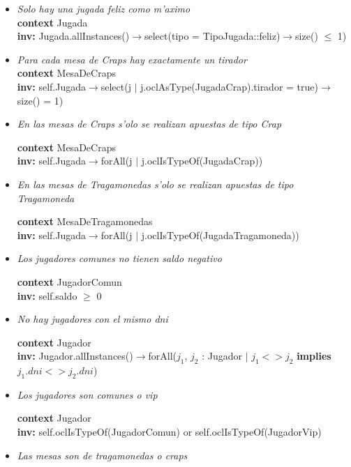 \begin{itemize}
 \item \textit{ Solo hay una jugada feliz como m'aximo \\}
  \textbf{context} Jugada 
  \\ \textbf{inv:} 
  Jugada.allInstances()$\rightarrow$select(tipo = TipoJugada::feliz)$\rightarrow$size() $\leq$ 1)


\item \textit{ Para cada mesa de Craps hay exactamente un tirador \\}
\textbf{context}  MesaDeCraps \\ \textbf{inv:} 
  self.Jugada$\rightarrow$select(j $|$ j.oclAsType(JugadaCrap).tirador = true)$\rightarrow$size() = 1)


\item \textit{En las mesas de Craps s'olo se realizan apuestas de tipo Crap} 

\textbf{context}  MesaDeCraps \\ \textbf{inv:} 
  self.Jugada$\rightarrow$forAll(j $|$ j.oclIsTypeOf(JugadaCrap))


\item \textit{En las mesas de Tragamonedas s'olo se realizan apuestas de tipo Tragamoneda}

\textbf{context}  MesaDeTragamonedas \\ \textbf{inv:} 
  self.Jugada$\rightarrow$forAll(j $|$ j.oclIsTypeOf(JugadaTragamoneda))

\item \textit{Los jugadores comunes no tienen saldo negativo}

\textbf{context}  JugadorComun \\ \textbf{inv:} 
  self.saldo $\geq$ 0

\item \textit{ No hay jugadores con el mismo dni}

\textbf{context}  Jugador \\ \textbf{inv:} 
  Jugador.allInstances()$\rightarrow$forAll($j_{1}$, $j_{2}$ : Jugador $|$ $j_{1} < > j_{2}$ \textbf{implies} $j_{1}.dni < > j_{2}.dni$)


\item \textit{Los jugadores son comunes o vip}

\textbf{context}  Jugador \\ \textbf{inv:} 
  self.oclIsTypeOf(JugadorComun) or self.oclIsTypeOf(JugadorVip)


\item \textit{Las mesas son de tragamonedas o craps}


\end{itemize}
